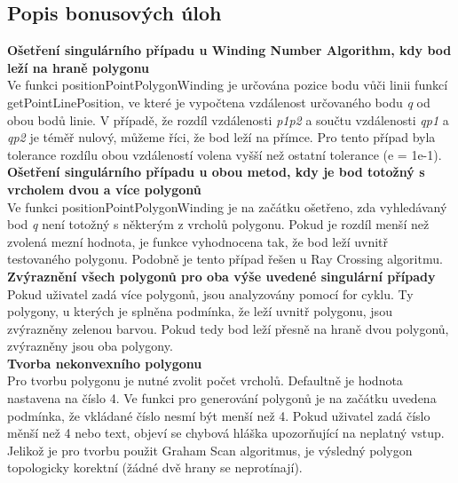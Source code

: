 \documentclass[a4paper,11pt,twoside]{article}
\begin{document}
\newpage
\vspace*{-1cm}
\subsection{Popis bonusových úloh}
\noindent\textbf{Ošetření singulárního případu u Winding Number Algorithm, kdy bod leží na hraně polygonu}\\
Ve funkci positionPointPolygonWinding je určována pozice bodu vůči linii funkcí getPointLinePosition, ve které je vypočtena vzdálenost určovaného bodu \textit{q} od obou bodů linie. V případě, že rozdíl vzdálenosti \textit{p1p2} a součtu vzdálenosti \textit{qp1} a \textit{qp2} je téměř nulový, můžeme říci, že bod leží na přímce.  Pro tento případ byla tolerance rozdílu obou vzdáleností volena vyšší než ostatní tolerance (e = 1e-1).\\

\noindent\textbf{Ošetření singulárního případu u obou metod, kdy je bod totožný s vrcholem dvou a více polygonů}\\
Ve funkci positionPointPolygonWinding je na začátku ošetřeno, zda vyhledávaný bod \textit{q} není totožný s některým z vrcholů polygonu. Pokud je rozdíl menší než zvolená mezní hodnota, je funkce vyhodnocena tak, že bod leží uvnitř testovaného polygonu. Podobně je tento případ řešen u Ray Crossing algoritmu.\\

\noindent\textbf{Zvýraznění všech polygonů pro oba výše uvedené singulární případy}\\
Pokud uživatel zadá více polygonů, jsou analyzovány pomocí for cyklu. Ty polygony, u kterých je splněna podmínka, že leží uvnitř polygonu, jsou zvýrazněny zelenou barvou. Pokud tedy bod leží přesně na hraně dvou polygonů, zvýrazněny jsou oba polygony.\\

\noindent\textbf{Tvorba nekonvexního polygonu}\\
Pro tvorbu polygonu je nutné zvolit počet vrcholů. Defaultně je hodnota nastavena na číslo 4. Ve funkci pro generování polygonů je na začátku uvedena podmínka, že vkládané číslo nesmí být menší než 4. Pokud uživatel zadá číslo měnší než 4 nebo text, objeví se chybová hláška upozorňující na neplatný vstup. Jelikož je pro tvorbu použit Graham Scan algoritmus, je výsledný polygon topologicky korektní (žádné dvě hrany se neprotínají).


\newpage
{}
\end{document}
